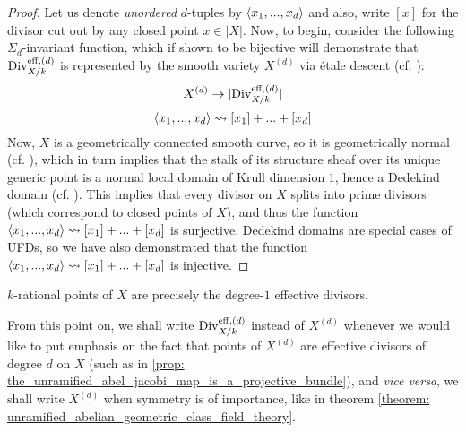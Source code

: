            \begin{proof}
                Let us denote \textit{unordered} $d$-tuples by $\langle x_1, ..., x_d\rangle$ and also, write $[x]$ for the divisor cut out by any closed point $x \in |X|$. Now, to begin, consider the following $\Sigma_d$-invariant function, which if shown to be bijective will demonstrate that $\mathrm{Div}_{X/k}^{\mathrm{eff}, (d)}$ is represented by the smooth variety $X^{(d)}$ via \'etale descent (cf. \cite[\href{https://stacks.math.columbia.edu/tag/024V}{Tag 024V}]{stacks}):
                    $$X^{(d)} \to |\mathrm{Div}_{X/k}^{\mathrm{eff}, (d)}|$$
                    $$\langle x_1, ..., x_d\rangle \leadsto [x_1] + ... + [x_d]$$
                Now, $X$ is a geometrically connected smooth curve, so it is geometrically normal (cf. \cite[\href{https://stacks.math.columbia.edu/tag/056T}{Tag 056T}]{stacks}), which in turn implies that the stalk of its structure sheaf over its unique generic point is a normal local domain of Krull dimension $1$, hence a Dedekind domain (cf. \cite[\href{https://stacks.math.columbia.edu/tag/034X}{Tag 034X}]{stacks}). This implies that every divisor on $X$ splits into prime divisors (which correspond to closed points of $X$), and thus the function $\langle x_1, ..., x_d\rangle \leadsto [x_1] + ... + [x_d]$ is surjective. Dedekind domains are special cases of UFDs, so we have also demonstrated that the function $\langle x_1, ..., x_d\rangle \leadsto [x_1] + ... + [x_d]$ is injective.
            \end{proof}
        \begin{corollary}
            $k$-rational points of $X$ are precisely the degree-$1$ effective divisors.
        \end{corollary}
        \begin{convention}
            From this point on, we shall write $\mathrm{Div}_{X/k}^{\mathrm{eff}, (d)}$ instead of $X^{(d)}$ whenever we would like to put emphasis on the fact that points of $X^{(d)}$ are effective divisors of degree $d$ on $X$ (such as in \ref{prop: the_unramified_abel_jacobi_map_is_a_projective_bundle}), and \textit{vice versa}, we shall write $X^{(d)}$ when symmetry is of importance, like in theorem \ref{theorem: unramified_abelian_geometric_class_field_theory}.
        \end{convention}
        
